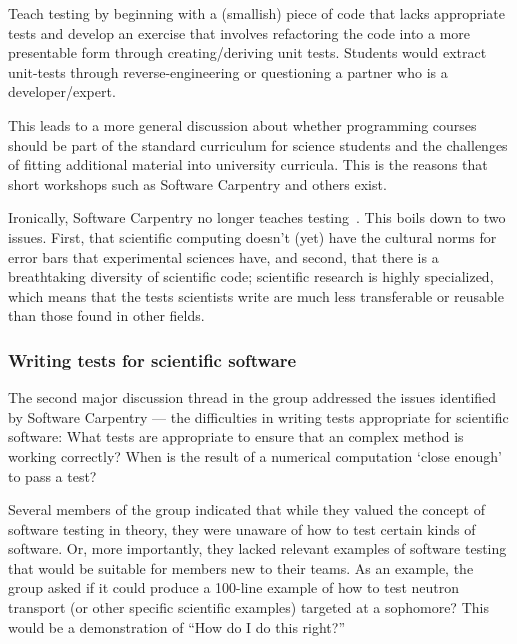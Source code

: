 \documentclass[11pt, oneside]{amsart}
\begin{document}
Teach testing by beginning with a (smallish) piece of code that lacks
appropriate tests and develop an exercise that involves refactoring the code
into a more presentable form through creating/deriving unit tests. Students
would extract unit-tests through reverse-engineering or questioning a
partner who is a developer/expert.

This leads to a more general discussion about whether programming courses
should be part of the standard curriculum for science students and the
challenges of fitting additional material into university curricula. This is the
reasons that short workshops such as Software Carpentry and others exist.

Ironically, Software Carpentry no longer teaches testing~\cite{SCtesting}. This
boils down to two issues. First, that scientific computing doesn't (yet) have
the cultural norms for error bars that experimental sciences have, and second,
that there is a breathtaking diversity of scientific code; scientific research
is highly specialized, which means that the tests scientists write are much less
transferable or reusable than those found in other fields.

\subsubsection{Writing tests for scientific software}
The second major discussion thread in the group addressed the issues identified
by Software Carpentry --- the difficulties in writing tests appropriate for
scientific software: %
What tests are
appropriate to ensure that an complex method is working correctly? When is the
result of a numerical computation `close enough' to pass a test?
 
Several members of the group indicated that while they valued the concept of
software testing in theory, they were unaware of how to test certain kinds of
software. Or, more importantly, they lacked relevant examples of software
testing that would be suitable for members new to their teams. As an example, the
group asked if it could produce a 100-line example of how to test neutron
transport (or other specific scientific examples) targeted at a sophomore? This
would be a demonstration of ``How do I do this right?''
\end{document}
